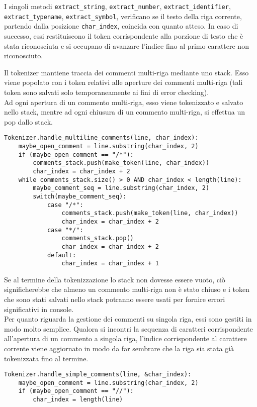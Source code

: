 I singoli metodi \texttt{extract\_string}, \texttt{extract\_number}, 
\texttt{extract\_identifier}, \texttt{extract\_typename}, 
\texttt{extract\_symbol}, verificano se il testo della riga corrente, 
partendo dalla posizione \texttt{char\_index}, coincida con quanto 
atteso. In caso di successo, essi restituiscono il token corrispondente 
alla porzione di testo che è stata riconosciuta e si occupano di 
avanzare l'indice fino al primo carattere non riconosciuto. 

\newpage

Il tokenizer mantiene traccia dei commenti multi-riga mediante uno 
stack. Esso viene popolato con i token relativi alle aperture dei 
commenti multi-riga (tali token sono salvati solo temporaneamente ai 
fini di error checking). \\

Ad ogni apertura di un commento multi-riga, esso viene tokenizzato 
e salvato nello stack, mentre ad ogni chiusura di un commento multi-riga, 
si effettua un pop dallo stack. \\


\vspace{0.5cm}
\begin{lstlisting}[frame=single]
Tokenizer.handle_multiline_comments(line, char_index):
    maybe_open_comment = line.substring(char_index, 2)
    if (maybe_open_comment == "/*"):
        comments_stack.push(make_token(line, char_index))
        char_index = char_index + 2
    while comments_stack.size() > 0 AND char_index < length(line):
        maybe_comment_seq = line.substring(char_index, 2)
        switch(maybe_comment_seq):
            case "/*": 
                comments_stack.push(make_token(line, char_index))
                char_index = char_index + 2
            case "*/":
                comments_stack.pop()
                char_index = char_index + 2
            default:
                char_index = char_index + 1
\end{lstlisting}    
\vspace{0.5cm}

Se al termine della tokenizzazione lo stack non dovesse essere vuoto, 
ciò significherebbe che almeno un commento multi-riga non è stato chiuso 
e i token che sono stati salvati nello stack potranno essere usati 
per fornire errori significativi in console. \\

Per quanto riguarda la gestione dei commenti su singola riga, essi 
sono gestiti in modo molto semplice. Qualora si incontri la sequenza
di caratteri corrispondente all'apertura di un commento a singola riga, 
l'indice corrispondente al carattere corrente viene aggiornato 
in modo da far sembrare che la riga sia stata già tokenizzata fino al termine.


\vspace{0.5cm}
\begin{lstlisting}[frame=single]
Tokenizer.handle_simple_comments(line, &char_index):
    maybe_open_comment = line.substring(char_index, 2)
    if (maybe_open_comment == "//"):
        char_index = length(line)
\end{lstlisting}    
\vspace{0.5cm}